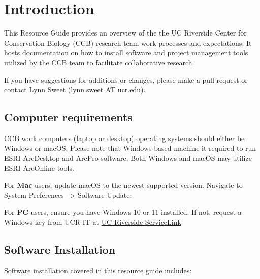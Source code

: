 \documentclass[
]{book}
\begin{document}
\hypertarget{intro}{%
\chapter{Introduction}\label{intro}}

This Resource Guide provides an overview of the the UC Riverside Center for Conservation Biology (CCB) research team work processes and expectations. It hosts documentation on how to install software and project management tools utilized by the CCB team to facilitate collaborative research.

If you have suggestions for additions or changes, please make a pull request or contact Lynn Sweet (lynn.sweet AT ucr.edu).

\hypertarget{computer-requirements}{%
\section{Computer requirements}\label{computer-requirements}}

CCB work computers (laptop or desktop) operating systems should either be Windows or macOS. Please note that Windows based machine it required to run ESRI ArcDesktop and ArcPro software. Both Windows and macOS may utilize ESRI ArcOnline tools.

For \textbf{Mac} users, update macOS to the newest supported version. Navigate to System Preferences --\textgreater{} Software Update.

For \textbf{PC} users, ensure you have Windows 10 or 11 installed. If not, request a Windows key from UCR IT at \href{https://ucrsupport.service-now.com/ucr_portal?id=ucr_home}{UC Riverside ServiceLink}

\hypertarget{software-installation}{%
\section{Software Installation}\label{software-installation}}

Software installation covered in this resource guide includes:
\end{document}
